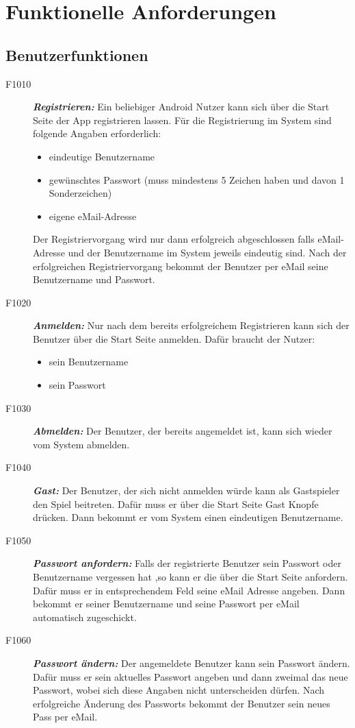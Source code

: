 \documentclass[parskip=full]{scrartcl}
\begin{document}
\section{Funktionelle Anforderungen}
\subsection{Benutzerfunktionen}
\begin{description}
	\item[F1010] \textbf{\textit{Registrieren: }} Ein beliebiger  \gls{Android} Nutzer kann sich über die Start Seite der App registrieren lassen. Für die Registrierung im System sind folgende Angaben erforderlich: 
	\begin{itemize}
		\item eindeutige Benutzername
		\item gewünschtes Passwort (muss mindestens 5 Zeichen haben und davon 1 Sonderzeichen)
		\item eigene eMail-Adresse
	\end{itemize}
	Der Registriervorgang wird nur dann erfolgreich abgeschlossen falls eMail-Adresse und der Benutzername im System jeweils eindeutig sind. Nach der erfolgreichen Registriervorgang bekommt der Benutzer per eMail seine Benutzername und Passwort.
	\item[F1020] \textbf{\textit{Anmelden: }} Nur nach dem bereits erfolgreichem Registrieren kann sich der Benutzer über die Start Seite anmelden. Dafür braucht der Nutzer:
	\begin{itemize}
		\item sein Benutzername
		\item sein Passwort
	\end{itemize}  
	\item[F1030] \textbf{\textit{Abmelden: }} Der Benutzer, der bereits angemeldet ist, kann sich wieder vom System abmelden.
	\item[F1040] \textbf{\textit{Gast: }} Der Benutzer, der sich nicht anmelden würde kann als Gastspieler den Spiel beitreten. Dafür muss er über die Start Seite Gast Knopfe drücken. Dann bekommt er vom System einen eindeutigen Benutzername. %
	\item[F1050] \textbf{\textit{Passwort anfordern: }} Falls der registrierte Benutzer sein Passwort oder Benutzername vergessen hat ,so kann er die über die Start Seite anfordern. Dafür muss er in entsprechendem Feld seine eMail Adresse angeben. Dann bekommt er seiner Benutzername und seine Passwort per eMail automatisch zugeschickt.
	\item[F1060] \textbf{\textit{Passwort ändern: }}
	Der angemeldete Benutzer kann sein Passwort ändern. Dafür muss er sein aktuelles Passwort angeben und dann zweimal das neue Passwort, wobei sich diese Angaben nicht unterscheiden dürfen. Nach erfolgreiche Änderung des Passworts bekommt der Benutzer sein neues Pass per eMail.
	
	
\end{description}
\end{document}
